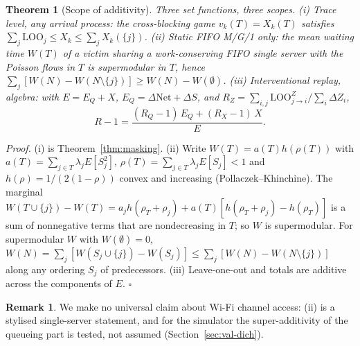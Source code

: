 \documentclass[11pt]{article}
\newtheorem{theorem}{Theorem}
\theoremstyle{definition}
\newtheorem{remark}{Remark}
\newcommand{\Net}{\mathrm{Net}}
\begin{document}
\begin{theorem}[Scope of additivity]\label{thm:dichotomy}
Three set functions, three scopes. (i) \emph{Trace level, any arrival process:} the cross-blocking game $v_k(T)=X_k(T)$ satisfies $\sum_j\mathrm{LOO}_j\le X_k\le\sum_jX_k(\{j\})$. (ii) \emph{Static FIFO M/G/1 only:} the mean waiting time $W(T)$ of a victim sharing a work-conserving FIFO single server with the Poisson flows in $T$ is supermodular in $T$, hence $\sum_j[W(N)-W(N\setminus\{j\})]\ge W(N)-W(\emptyset)$. (iii) \emph{Interventional replay, algebra:} with $E=E_Q+X$, $E_Q=\Delta\Net+\Delta S$, and $R_Z=\sum_{i,j}\mathrm{LOO}^Z_{j\to i}/\sum_i\Delta Z_i$,
\[
R-1=\frac{(R_Q-1)\,E_Q+(R_X-1)\,X}{E}.
\]
\end{theorem}
\emph{Proof.} (i) is Theorem~\ref{thm:masking}. (ii) Write $W(T)=a(T)h(\rho(T))$ with $a(T)=\sum_{j\in T}\lambda_jE[S_j^2]$, $\rho(T)=\sum_{j\in T}\lambda_jE[S_j]<1$ and $h(\rho)=1/(2(1-\rho))$ convex and increasing (Pollaczek--Khinchine). The marginal $W(T\cup\{j\})-W(T)=a_jh(\rho_T+\rho_j)+a(T)[h(\rho_T+\rho_j)-h(\rho_T)]$ is a sum of nonnegative terms that are nondecreasing in $T$; so $W$ is supermodular. For supermodular $W$ with $W(\emptyset)=0$, $W(N)=\sum_j[W(S_j\cup\{j\})-W(S_j)]\le\sum_j[W(N)-W(N\setminus\{j\})]$ along any ordering $S_j$ of predecessors. (iii) Leave-one-out and totals are additive across the components of $E$. \hfill$\square$
\begin{remark}
We make no universal claim about Wi-Fi channel access: (ii) is a stylised single-server statement, and for the simulator the super-additivity of the queueing part is tested, not assumed (Section~\ref{sec:val-dich}).
\end{remark}
\end{document}
